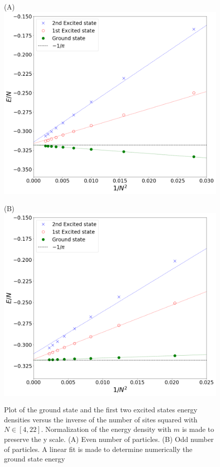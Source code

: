 \begin{figure}[htb]
    \begin{minipage}{.5\textwidth}
    \centering(A)
    \includegraphics[scale=0.18]{figures/ExcitedStatesEven_m0_N-2.png}
    \end{minipage}%
    \begin{minipage}{0.5\textwidth}
    \centering(B)
    \includegraphics[scale=0.18]{figures/ExcitedStatesOdd_m0_N-2.png}
    \end{minipage}
    \caption{Plot of the ground state and the first two excited states energy densities versus the inverse of the number of sites squared with $N\in[4,22]$. Normalization of the energy density with $m$ is made to preserve the y scale. (A) Even number of particles. (B) Odd number of particles. A linear fit is made to determine numerically the ground state energy}\label{fig:excitedStatesMassles}
\end{figure}

